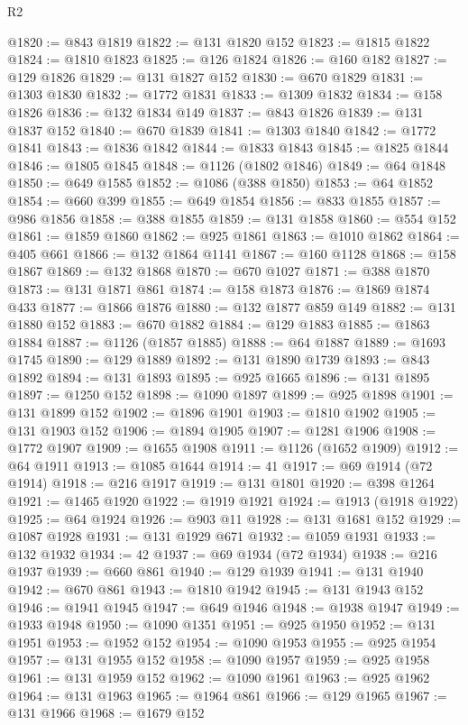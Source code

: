 \begin{lexlean}{R2}
\begin{coremodule}
@1820 := @843 @1819
@1822 := @131 @1820 @152
@1823 := @1815 @1822
@1824 := @1810 @1823
@1825 := @126 @1824
@1826 := @160 @182
@1827 := @129 @1826
@1829 := @131 @1827 @152
@1830 := @670 @1829
@1831 := @1303 @1830
@1832 := @1772 @1831
@1833 := @1309 @1832
@1834 := @158 @1826
@1836 := @132 @1834 @149
@1837 := @843 @1826
@1839 := @131 @1837 @152
@1840 := @670 @1839
@1841 := @1303 @1840
@1842 := @1772 @1841
@1843 := @1836 @1842
@1844 := @1833 @1843
@1845 := @1825 @1844
@1846 := @1805 @1845
@1848 := @1126 (@1802 @1846)
@1849 := @64 @1848
@1850 := @649 @1585
@1852 := @1086 (@388 @1850)
@1853 := @64 @1852
@1854 := @660 @399
@1855 := @649 @1854
@1856 := @833 @1855
@1857 := @986 @1856
@1858 := @388 @1855
@1859 := @131 @1858
@1860 := @554 @152
@1861 := @1859 @1860
@1862 := @925 @1861
@1863 := @1010 @1862
@1864 := @405 @661
@1866 := @132 @1864 @1141
@1867 := @160 @1128
@1868 := @158 @1867
@1869 := @132 @1868
@1870 := @670 @1027
@1871 := @388 @1870
@1873 := @131 @1871 @861
@1874 := @158 @1873
@1876 := @1869 @1874 @433
@1877 := @1866 @1876
@1880 := @132 @1877 @859 @149
@1882 := @131 @1880 @152
@1883 := @670 @1882
@1884 := @129 @1883
@1885 := @1863 @1884
@1887 := @1126 (@1857 @1885)
@1888 := @64 @1887
@1889 := @1693 @1745
@1890 := @129 @1889
@1892 := @131 @1890 @1739
@1893 := @843 @1892
@1894 := @131 @1893
@1895 := @925 @1665
@1896 := @131 @1895
@1897 := @1250 @152
@1898 := @1090 @1897
@1899 := @925 @1898
@1901 := @131 @1899 @152
@1902 := @1896 @1901
@1903 := @1810 @1902
@1905 := @131 @1903 @152
@1906 := @1894 @1905
@1907 := @1281 @1906
@1908 := @1772 @1907
@1909 := @1655 @1908
@1911 := @1126 (@1652 @1909)
@1912 := @64 @1911
@1913 := @1085 @1644
@1914 := 41
@1917 := @69 @1914 (@72 @1914)
@1918 := @216 @1917
@1919 := @131 @1801
@1920 := @398 @1264
@1921 := @1465 @1920
@1922 := @1919 @1921
@1924 := @1913 (@1918 @1922)
@1925 := @64 @1924
@1926 := @903 @11
@1928 := @131 @1681 @152
@1929 := @1087 @1928
@1931 := @131 @1929 @671
@1932 := @1059 @1931
@1933 := @132 @1932
@1934 := 42
@1937 := @69 @1934 (@72 @1934)
@1938 := @216 @1937
@1939 := @660 @861
@1940 := @129 @1939
@1941 := @131 @1940
@1942 := @670 @861
@1943 := @1810 @1942
@1945 := @131 @1943 @152
@1946 := @1941 @1945
@1947 := @649 @1946
@1948 := @1938 @1947
@1949 := @1933 @1948
@1950 := @1090 @1351
@1951 := @925 @1950
@1952 := @131 @1951
@1953 := @1952 @152
@1954 := @1090 @1953
@1955 := @925 @1954
@1957 := @131 @1955 @152
@1958 := @1090 @1957
@1959 := @925 @1958
@1961 := @131 @1959 @152
@1962 := @1090 @1961
@1963 := @925 @1962
@1964 := @131 @1963
@1965 := @1964 @861
@1966 := @129 @1965
@1967 := @131 @1966
@1968 := @1679 @152

\end{coremodule}
\end{lexlean}
